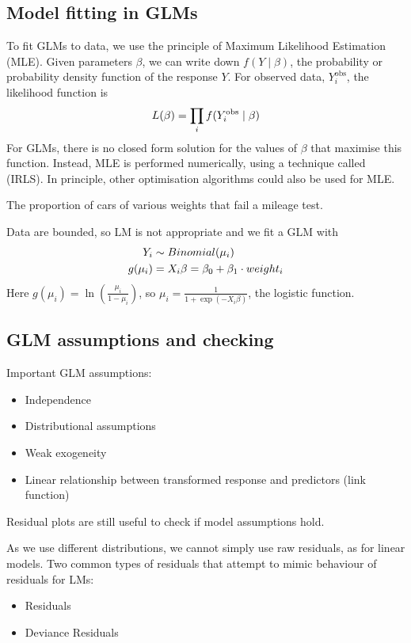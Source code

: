 \subsection{Model fitting in GLMs}

To fit GLMs to data, we use the principle of Maximum Likelihood Estimation (MLE). Given parameters $\beta$, we can write down $f(Y\mid \beta)$, the probability or probability density function of the response $Y$. For observed data, $Y_i^{\text{obs}}$, the likelihood function is
\begin{align}
	L(\beta) = \prod_i f(Y_i^{\text{obs}}\mid \beta)\notag
\end{align}
For GLMs, there is no closed form solution for the values of $\beta$ that maximise this function. Instead, MLE is performed numerically, using a technique called  (IRLS). In principle, other optimisation algorithms could also be used for MLE.

\begin{example}
	The proportion of cars of various weights that fail a mileage test.
	
	Data are bounded, so LM is not appropriate and we fit a GLM with
	\begin{align}
		Y_i &\sim Binomial(\mu_i) \notag \\
		g(\mu_i) &= X_i\beta = \beta_0 + \beta_1\cdot weight_i \notag
	\end{align}
	Here $g(\mu_i) = \ln\left(\frac{\mu_i}{1-\mu_i}\right)$, so $\mu_i=\frac{1}{1+\exp(-X_i\beta)}$, the logistic function.
\end{example}

\subsection{GLM assumptions and checking}

Important GLM assumptions:
\begin{itemize}
	\item Independence
	\item Distributional assumptions
	\item Weak exogeneity
	\item Linear relationship between transformed response and predictors (link function)
\end{itemize}
Residual plots are still useful to check if model assumptions hold.

As we use different distributions, we cannot simply use raw residuals, as for linear models. Two common types of residuals that attempt to mimic behaviour of residuals for LMs:
\begin{itemize}
	\item {} Residuals
	\item Deviance Residuals
\end{itemize}

